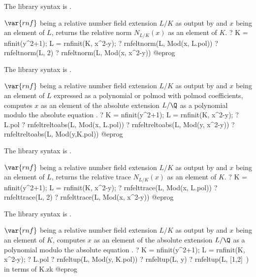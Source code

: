 The library syntax is .

\label{se:rnfeltnorm}
$\var{rnf}$ being a relative number field extension $L/K$ as output by
 and $x$ being an element of $L$, returns the relative norm
$N_{L/K}(x)$ as an element of $K$.
\bprog
? K = nfinit(y^2+1); L = rnfinit(K, x^2-y);
? rnfeltnorm(L, Mod(x, L.pol))
? rnfeltnorm(L, 2)
? rnfeltnorm(L, Mod(x, x^2-y))
@eprog

The library syntax is .

\label{se:rnfeltreltoabs}
$\var{rnf}$ being a relative
number field extension $L/K$ as output by  and $x$ being an
element of $L$ expressed as a polynomial or polmod with polmod
coefficients, computes $x$ as an element of the absolute extension $L/\Q$ as
a polynomial modulo the absolute equation .
\bprog
? K = nfinit(y^2+1); L = rnfinit(K, x^2-y);
? L.pol
? rnfeltreltoabs(L, Mod(x, L.pol))
? rnfeltreltoabs(L, Mod(y, x^2-y))
? rnfeltreltoabs(L, Mod(y,K.pol))
@eprog

The library syntax is .

\label{se:rnfelttrace}
$\var{rnf}$ being a relative number field extension $L/K$ as output by
 and $x$ being an element of $L$, returns the relative trace
$N_{L/K}(x)$ as an element of $K$.
\bprog
? K = nfinit(y^2+1); L = rnfinit(K, x^2-y);
? rnfelttrace(L, Mod(x, L.pol))
? rnfelttrace(L, 2)
? rnfelttrace(L, Mod(x, x^2-y))
@eprog

The library syntax is .

\label{se:rnfeltup}
$\var{rnf}$ being a relative number field extension $L/K$ as output by
 and $x$ being an element of $K$, computes $x$ as an element of
the absolute extension $L/\Q$ as a polynomial modulo the absolute equation
.
\bprog
? K = nfinit(y^2+1); L = rnfinit(K, x^2-y);
? L.pol
? rnfeltup(L, Mod(y, K.pol))
? rnfeltup(L, y)
? rnfeltup(L, [1,2]~) \\ in terms of K.zk
@eprog


